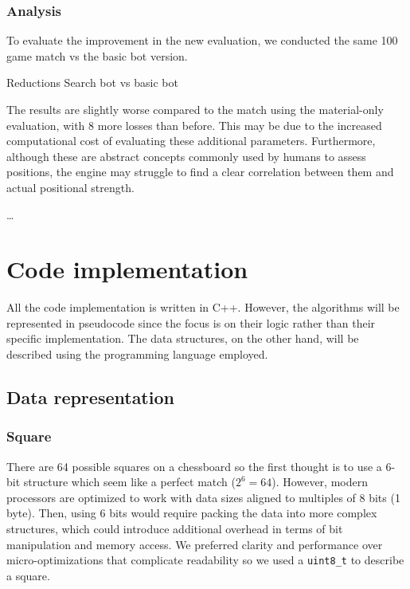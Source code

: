 \subsubsection{Analysis}

To evaluate the improvement in the new evaluation, we conducted the same 100 game match vs the basic bot version.

\vspace{1em}

Reductions Search bot vs basic bot\\
\medskip

\noindent The results are slightly worse compared to the match using the material-only evaluation, with 8 more losses than before. This may be due to the increased computational cost of evaluating these additional parameters. Furthermore, although these are abstract concepts commonly used by humans to assess positions, the engine may struggle to find a clear correlation between them and actual positional strength.

\ldots

\section{Code implementation}
\label{sec:code}

All the code implementation is written in C++. However, the algorithms will be represented in pseudocode since the focus is on their logic rather than their specific implementation. The data structures, on the other hand, will be described using the programming language employed.

\subsection{Data representation}

\subsubsection{Square}

There are 64 possible squares on a chessboard so the first thought is to use a 6-bit structure which seem like a perfect match ($2^6 = 64$). However, modern processors are optimized to work with data sizes aligned to multiples of 8 bits (1 byte). Then, using 6 bits would require packing the data into more complex structures, which could introduce additional overhead in terms of bit manipulation and memory access. We preferred clarity and performance over micro-optimizations that complicate readability so we used a \texttt{uint8\_t} to describe a square.

